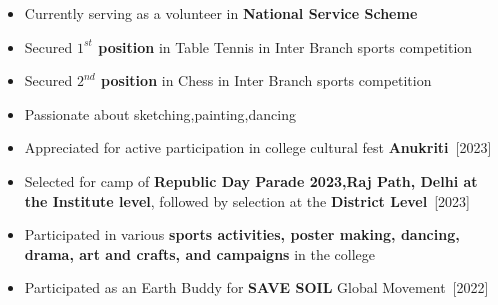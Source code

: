 \documentclass[10pt]{article}
\begin{document}
\begin{itemize}[itemsep = -0.75 mm, leftmargin=*]
\item \noindent  Currently serving as a volunteer in \textbf{National Service Scheme}
 \item \noindent Secured \textbf{$1^{st}$ position} in Table Tennis in Inter Branch sports competition  
 \item \noindent Secured \textbf{$2^{nd}$ position} in Chess in Inter Branch sports competition  
 \item \noindent Passionate about sketching,painting,dancing
 \item \noindent Appreciated for active participation in college cultural fest \textbf{Anukriti}\hfill {\ \small [2023]}
 \item \noindent Selected for camp of \textbf{Republic Day Parade 2023,Raj Path, Delhi at the Institute level}, followed by selection at the \textbf{District Level}\hfill {\ \small [2023]}
 \item \noindent Participated in various \textbf{sports activities, poster making, dancing, drama, art and crafts, and campaigns} in the college
\item  Participated as an Earth Buddy for \textbf {SAVE SOIL } Global Movement\hfill {\ \small [2022]}
\end{itemize}
\end{document}
